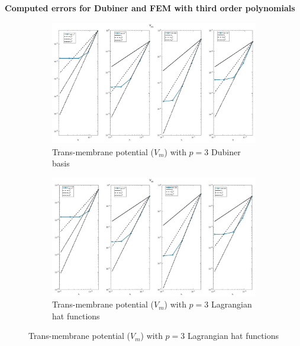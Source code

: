 \documentclass[a4paper,11pt]{article}
\begin{document}
\newpage
\begin{center}
\textbf{Computed errors for Dubiner and FEM with third order polynomials}
\end{center}
\begin{figure}[H]
\caption{Comparison of the trans-membrane potential ($V_m$)}
\label{Vm_3}
\begin{subfigure}{\textwidth}
\begin{center}
\includegraphics[width =\textwidth]{./D3_Vm_1.jpg}
\caption{Trans-membrane potential ($V_m$) with $p=3$ Dubiner basis}
\end{center}
\end{subfigure}
\begin{subfigure}{\textwidth}
\begin{center}
\includegraphics[width =\textwidth]{./P3_Vm_1.jpg}
\caption{Trans-membrane potential ($V_m$) with $p=3$ Lagrangian hat functions}
\end{center}
\end{subfigure}
\end{figure}
\end{document}
